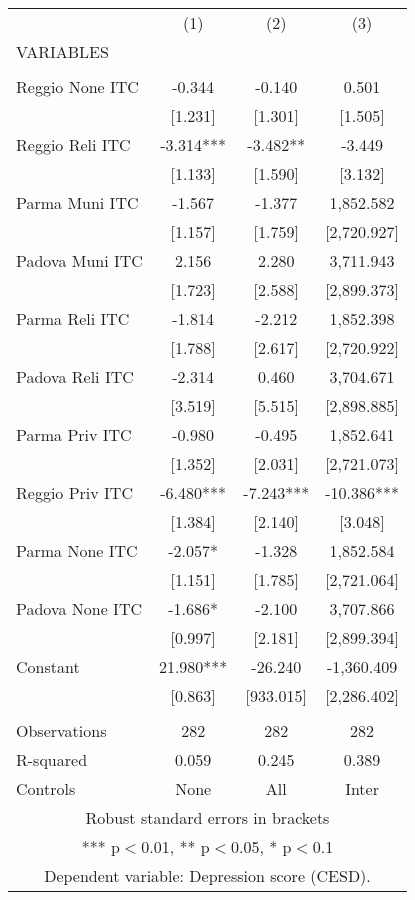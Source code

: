 \begin{tabular}{lccc} \hline
 & (1) & (2) & (3) \\
VARIABLES &  &  &  \\ \hline
 &  &  &  \\
Reggio None ITC & -0.344 & -0.140 & 0.501 \\
 & [1.231] & [1.301] & [1.505] \\
Reggio Reli ITC & -3.314*** & -3.482** & -3.449 \\
 & [1.133] & [1.590] & [3.132] \\
Parma Muni ITC & -1.567 & -1.377 & 1,852.582 \\
 & [1.157] & [1.759] & [2,720.927] \\
Padova Muni ITC & 2.156 & 2.280 & 3,711.943 \\
 & [1.723] & [2.588] & [2,899.373] \\
Parma Reli ITC & -1.814 & -2.212 & 1,852.398 \\
 & [1.788] & [2.617] & [2,720.922] \\
Padova Reli ITC & -2.314 & 0.460 & 3,704.671 \\
 & [3.519] & [5.515] & [2,898.885] \\
Parma Priv ITC & -0.980 & -0.495 & 1,852.641 \\
 & [1.352] & [2.031] & [2,721.073] \\
Reggio Priv ITC & -6.480*** & -7.243*** & -10.386*** \\
 & [1.384] & [2.140] & [3.048] \\
Parma None ITC & -2.057* & -1.328 & 1,852.584 \\
 & [1.151] & [1.785] & [2,721.064] \\
Padova None ITC & -1.686* & -2.100 & 3,707.866 \\
 & [0.997] & [2.181] & [2,899.394] \\
Constant & 21.980*** & -26.240 & -1,360.409 \\
 & [0.863] & [933.015] & [2,286.402] \\
 &  &  &  \\
Observations & 282 & 282 & 282 \\
R-squared & 0.059 & 0.245 & 0.389 \\
 Controls & None & All & Inter \\ \hline
\multicolumn{4}{c}{ Robust standard errors in brackets} \\
\multicolumn{4}{c}{ *** p$<$0.01, ** p$<$0.05, * p$<$0.1} \\
\multicolumn{4}{c}{ Dependent variable: Depression score (CESD).} \\
\end{tabular}
